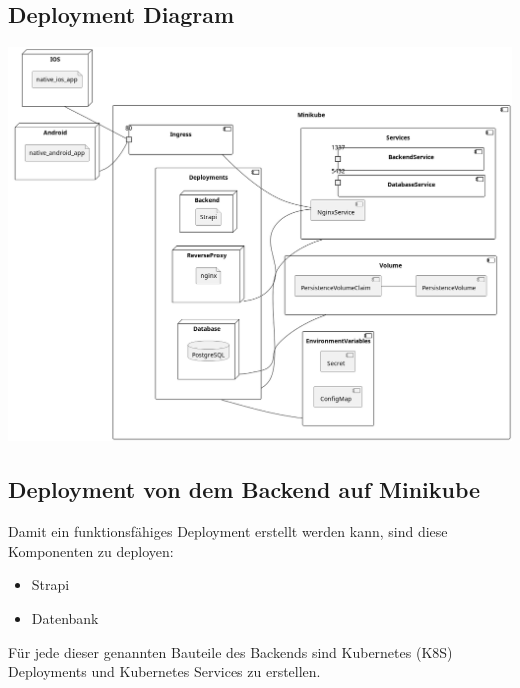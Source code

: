 



\subsection{Deployment Diagram}
\begin{center}
  \includegraphics[width=\textwidth]{pics/dev-deployment.png}
\end{center}
\subsection{Deployment von dem Backend auf Minikube}

Damit ein funktionsfähiges Deployment erstellt werden kann, sind diese Komponenten zu deployen:
\begin{itemize}
  \item Strapi
  \item Datenbank
\end{itemize}

Für jede dieser genannten Bauteile des Backends sind Kubernetes (K8S) Deployments und Kubernetes Services zu erstellen.

